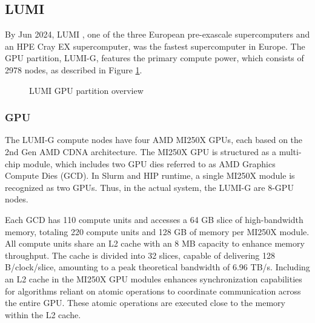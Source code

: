 \subsection{LUMI}
\label{subsec:lumi}
By Jun 2024, LUMI \cite{lumi}, one of the three European pre-exascale supercomputers and an HPE Cray EX supercomputer, was the fastest supercomputer in Europe. The GPU partition, LUMI-G, features the primary compute power, which consists of 2978 nodes, as described in Figure \ref{fig_lumig_overview}.

\begin{figure}[H]
    \centering
    \caption{LUMI GPU partition overview \cite{lumi}}
    \label{fig_lumig_overview}
\end{figure}

\subsubsection{GPU}

The LUMI-G compute nodes have four AMD MI250X GPUs, each based on the 2nd Gen AMD CDNA architecture. The MI250X GPU is structured as a multi-chip module, which includes two GPU dies referred to as AMD Graphics Compute Dies (GCD). In Slurm and HIP runtime, a single MI250X module is recognized as two GPUs. Thus, in the actual system, the LUMI-G are 8-GPU nodes.

Each GCD has 110 compute units and accesses a 64 GB slice of high-bandwidth memory, totaling 220 compute units and 128 GB of memory per MI250X module. All compute units share an L2 cache with an 8 MB capacity to enhance memory throughput. The cache is divided into 32 slices, capable of delivering 128 B/clock/slice, amounting to a peak theoretical bandwidth of 6.96 TB/s. Including an L2 cache in the MI250X GPU modules enhances synchronization capabilities for algorithms reliant on atomic operations to coordinate communication across the entire GPU. These atomic operations are executed close to the memory within the L2 cache.



